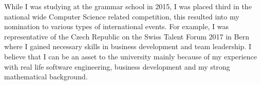 \documentclass[11pt, a4paper]{awesome-cv} %
\begin{document}
\begin{cvletter}
While I was studying at the grammar school in 2015, I was placed third in the national wide Computer Science related competition, 
this resulted into my nomination to various types of international events. 
For example, I was representative of the Czech Republic on the Swiss Talent Forum 2017 in Bern where I gained necessary skills in business development 
and team leadership.
I believe that I can be an asset to the university mainly because of my experience with real life software engineering, business development and my strong mathematical background.


\end{cvletter}


\makeletterclosing %
\end{document}
